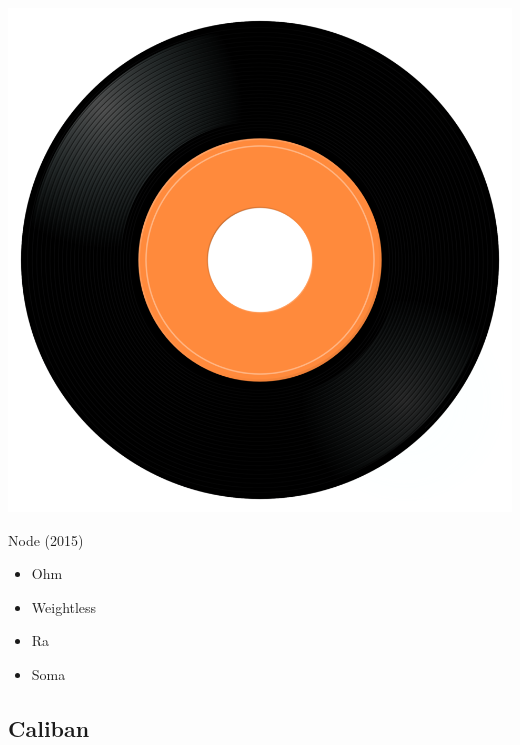 \begin{minipage}[t]{0.25\textwidth}
\captionsetup{type=figure}
\includegraphics[width=\textwidth]{Images/cover.png}
\caption*{Node (2015)}
\end{minipage}
\begin{minipage}[t]{0.25\textwidth}\vspace{0pt}
\begin{itemize}[nosep,leftmargin=1em,labelwidth=*,align=left]
	\setlength{\itemsep}{0pt}
	\item Ohm
	\item Weightless
	\item Ra
	\item Soma
\end{itemize}
\end{minipage}

\subsection{Caliban}

